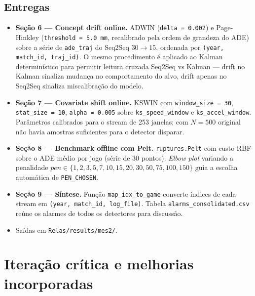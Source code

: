 \documentclass[11pt,a4paper]{article}
\begin{document}
\subsection{Entregas}

\begin{itemize}[leftmargin=1.4em,itemsep=2pt]
    \item \textbf{Se\c{c}\~ao 6 --- Concept drift online.} ADWIN
          (\texttt{delta = 0.002}) e Page-Hinkley
          (\texttt{threshold = 5.0 mm}, recalibrado pela ordem de grandeza
          do ADE) sobre a s\'erie de \texttt{ade\_traj} do Seq2Seq
          $30{\to}15$, ordenada por \texttt{(year, match\_id, traj\_id)}.
          O mesmo procedimento \'e aplicado ao Kalman determin\'istico para
          permitir leitura cruzada Seq2Seq vs Kalman --- drift no Kalman
          sinaliza mudan\c{c}a no comportamento do alvo, drift apenas no
          Seq2Seq sinaliza miscalibra\c{c}\~ao do modelo.
    \item \textbf{Se\c{c}\~ao 7 --- Covariate shift online.} KSWIN com
          \texttt{window\_size = 30}, \texttt{stat\_size = 10},
          \texttt{alpha = 0.005} sobre \texttt{ks\_speed\_window} e
          \texttt{ks\_accel\_window}. Par\^ametros calibrados para o stream
          de 253 janelas; com $N=500$ original n\~ao havia amostras
          suficientes para o detector disparar.
    \item \textbf{Se\c{c}\~ao 8 --- Benchmark offline com Pelt.}
          \texttt{ruptures.Pelt} com custo RBF sobre o ADE m\'edio por
          jogo (s\'erie de 30 pontos). \emph{Elbow plot} variando a
          penalidade $pen \in \{1, 2, 3, 5, 7, 10, 15, 20, 30, 50, 75, 100, 150\}$
          guia a escolha autom\'atica de \texttt{PEN\_CHOSEN}.
    \item \textbf{Se\c{c}\~ao 9 --- S\'intese.} Fun\c{c}\~ao
          \texttt{map\_idx\_to\_game} converte \'indices de cada stream
          em \texttt{(year, match\_id, log\_file)}. Tabela
          \texttt{alarms\_consolidated.csv} re\'une os alarmes de todos
          os detectores para discuss\~ao.
    \item Sa\'idas em \texttt{Relas/results/mes2/}.
\end{itemize}

\section{Itera\c{c}\~ao cr\'itica e melhorias incorporadas}
\end{document}
